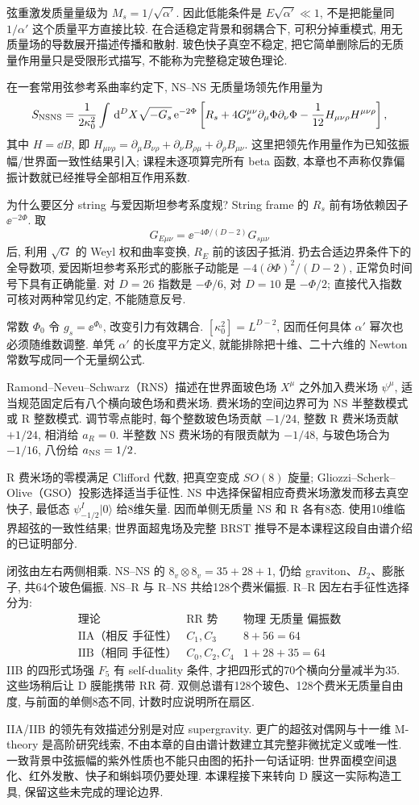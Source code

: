 弦重激发质量量级为 $M_s=1/\sqrt{\alpha'}$. 因此低能条件是 $E\sqrt{\alpha'}\ll1$, 不是把能量同 $1/\alpha'$ 这个质量平方直接比较. 在合适稳定背景和弱耦合下, 可积分掉重模式, 用无质量场的导数展开描述传播和散射. 玻色快子真空不稳定, 把它简单删除后的无质量作用量只是受限形式描写, 不能称为完整稳定玻色理论.

在一套常用弦参考系曲率约定下, NS--NS 无质量场领先作用量为
\[
S_{\rm NSNS}=\frac1{2\kappa_0^2}
\int\,\mathrm d^DX\sqrt{-G_s}\,\mathrm e^{-2\Phi}
\left[R_s+4G_s^{\mu\nu}\partial_\mu\Phi\partial_\nu\Phi
-\frac1{12}H_{\mu\nu\rho}H^{\mu\nu\rho}\right],
\]
其中 $H=\dd B$, 即 $H_{\mu\nu\rho}=\partial_\mu B_{\nu\rho}+\partial_\nu B_{\rho\mu}+\partial_\rho B_{\mu\nu}$. 这里把领先作用量作为已知弦振幅/世界面一致性结果引入; 课程未逐项算完所有 beta 函数, 本章也不声称仅靠偏振计数就已经推导全部相互作用系数.

为什么要区分 string 与爱因斯坦参考系度规? String frame 的 $R_s$ 前有场依赖因子 $\ee^{-2\Phi}$. 取
\[
G_{E\mu\nu}=\ee^{-4\Phi/(D-2)}G_{s\mu\nu}
\]
后, 利用 $\sqrt G$ 的 Weyl 权和曲率变换, $R_E$ 前的该因子抵消. 扔去合适边界条件下的全导数项, 爱因斯坦参考系形式的膨胀子动能是 $-4(\partial\Phi)^2/(D-2)$, 正常负时间号下具有正确能量. 对 $D=26$ 指数是 $-\Phi/6$, 对 $D=10$ 是 $-\Phi/2$; 直接代入指数可核对两种常见约定, 不能随意反号.

常数 $\Phi_0$ 令 $g_s=\ee^{\Phi_0}$, 改变引力有效耦合. $[\kappa_0^2]=L^{D-2}$, 因而任何具体 $\alpha'$ 幂次也必须随维数调整. 单凭 $\alpha'$ 的长度平方定义, 就能排除把十维、二十六维的 Newton 常数写成同一个无量纲公式.

Ramond--Neveu--Schwarz（RNS）描述在世界面玻色场 $X^\mu$ 之外加入费米场 $\psi^\mu$, 适当规范固定后有八个横向玻色场和费米场. 费米场的空间边界可为 NS 半整数模式或 R 整数模式. 调节零点能时, 每个整数玻色场贡献 $-1/24$, 整数 R 费米场贡献 $+1/24$, 相消给 $a_R=0$. 半整数 NS 费米场的有限贡献为 $-1/48$, 与玻色场合为 $-1/16$, 八份给 $a_{\rm NS}=1/2$.

R 费米场的零模满足 Clifford 代数, 把真空变成 $SO(8)$ 旋量; Gliozzi--Scherk--Olive（GSO）投影选择适当手征性. NS 中选择保留相应奇费米场激发而移去真空快子, 最低态 $\psi_{-1/2}^I|0\rangle$ 给8维矢量. 因而单侧无质量 NS 和 R 各有8态. 使用10维临界超弦的一致性结果; 世界面超鬼场及完整 BRST 推导不是本课程这段自由谱介绍的已证明部分.

闭弦由左右两侧相乘. NS--NS 的 $8_v\otimes8_v=35+28+1$, 仍给 graviton、$B_2$、膨胀子, 共64个玻色偏振. NS--R 与 R--NS 共给128个费米偏振. R--R 因左右手征性选择分为:
\[
\begin{array}{c|c|c}
\text{理论}&\text{RR 势}&\text{物理 无质量 偏振数}\\\hline
\text{IIA（相反 手征性）}&C_1,C_3&8+56=64\\
\text{IIB（相同 手征性）}&C_0,C_2,C_4&1+28+35=64
\end{array}
\]
IIB 的四形式场强 $F_5$ 有 self-duality 条件, 才把四形式的70个横向分量减半为35. 这些场稍后让 D 膜能携带 RR 荷. 双侧总谱有128个玻色、128个费米无质量自由度, 与前面的单侧8态不同, 计数时应说明所在扇区.

IIA/IIB 的领先有效描述分别是对应 supergravity. 更广的超弦对偶网与十一维 M-theory 是高阶研究线索, 不由本章的自由谱计数建立其完整非微扰定义或唯一性. 一致背景中弦振幅的紫外性质也不能只由图的拓扑一句话证明: 世界面模空间退化、红外发散、快子和蝌蚪项仍要处理. 本课程接下来转向 D 膜这一实际构造工具, 保留这些未完成的理论边界.
